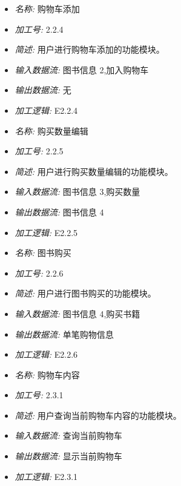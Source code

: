 \documentclass{article}
\begin{document}
\begin{CJK*}{UTF8}{gbsn}
\begin{itemize}
\end{itemize}


\vspace{-1mm}


\begin{itemize}
\item \textit{名称: }购物车添加
\item \textit{加工号: }2.2.4 
\item \textit{简述: }用户进行购物车添加的功能模块。 
\item \textit{输入数据流: }图书信息 2,加入购物车 
\item \textit{输出数据流: }无
\item \textit{加工逻辑: }E2.2.4

\end{itemize}


\vspace{-1mm}


\begin{itemize}
\item \textit{名称: }购买数量编辑
\item \textit{加工号: }2.2.5 
\item \textit{简述: }用户进行购买数量编辑的功能模块。 
\item \textit{输入数据流: }图书信息 3,购买数量 
\item \textit{输出数据流: }图书信息 4 
\item \textit{加工逻辑: }E2.2.5

\end{itemize}


\vspace{-1mm}


\begin{itemize}
\item \textit{名称: }图书购买
\item \textit{加工号: }2.2.6 
\item \textit{简述: }用户进行图书购买的功能模块。 
\item \textit{输入数据流: }图书信息 4,购买书籍 
\item \textit{输出数据流: }单笔购物信息 
\item \textit{加工逻辑: }E2.2.6

\end{itemize}


\vspace{-1mm}


\begin{itemize}
\item \textit{名称: }购物车内容
\item \textit{加工号: }2.3.1 
\item \textit{简述: }用户查询当前购物车内容的功能模块。 
\item \textit{输入数据流: }查询当前购物车 
\item \textit{输出数据流: }显示当前购物车 
\item \textit{加工逻辑: }E2.3.1


\end{itemize}
\end{CJK*}
\end{document}
